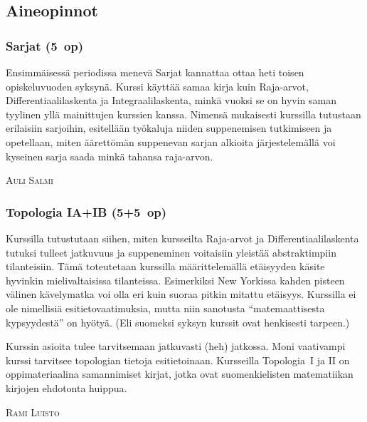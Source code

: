 \documentclass[../ala_hataile.tex]{subfiles}
\begin{document}
	\subsection*{Aineopinnot}
	\subsubsection*{Sarjat (5~op)}
	Ensimmäisessä periodissa menevä Sarjat kannattaa ottaa heti toisen opiskeluvuoden syksynä. Kurssi käyttää samaa kirja kuin Raja-arvot, Differentiaalilaskenta ja Integraalilaskenta, minkä vuoksi se on hyvin saman tyylinen yllä mainittujen kurssien kanssa. Nimensä mukaisesti kurssilla tutustaan erilaisiin sarjoihin, esitellään työkaluja niiden suppenemisen tutkimiseen ja opetellaan, miten äärettömän suppenevan sarjan alkioita järjestelemällä voi kyseinen sarja saada minkä tahansa raja-arvon.
	
	\vspace{0.5cm}
	\noindent\textsc{Auli Salmi}
	\subsubsection*{Topologia IA+IB (5+5~op)}
	Kurssilla tutustutaan siihen, miten kursseilta Raja-arvot ja
	Differentiaali\-laskenta tutuksi tulleet jatkuvuus ja suppeneminen
	voitaisiin yleistää abstraktimpiin
	tilanteisiin. Tämä toteutetaan kurssilla
	määrittelemällä etäisyyden käsite hyvinkin
	mielivaltaisissa tilanteissa. Esimerkiksi
	New Yorkissa kahden pisteen välinen kävelymatka
	voi olla eri kuin suoraa pitkin
	mitattu etäisyys. Kurssilla ei ole nimellisiä
	esitietovaatimuksia, mutta niin sanotusta
	``matemaattisesta kypsyydestä'' on hyötyä.
	(Eli suomeksi syksyn kurssit ovat henkisesti
	tarpeen.)
	
	Kurssin asioita tulee tarvitsemaan jatkuvasti
	(heh) jatkossa. Moni vaativampi
	kurssi tarvitsee topologian tietoja esitietoinaan.
	Kursseilla Topologia~I ja II on oppimateriaalina
	samannimiset kirjat, jotka
	ovat suomenkielisten matematiikan kirjojen
	ehdotonta huippua.
	
	\vspace{0.5cm}
	\noindent\textsc{Rami Luisto}
	
\end{document}
